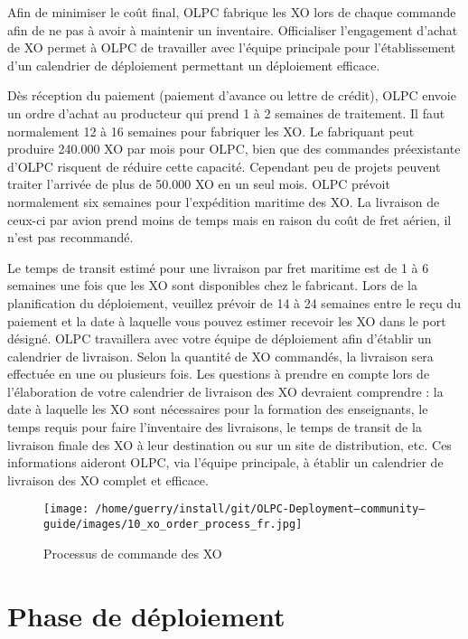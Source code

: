 \documentclass[12pt]{article}
\begin{document}

Afin de minimiser le coût final, OLPC fabrique les XO lors de chaque
commande afin de ne pas à avoir à maintenir un inventaire. Officialiser
l'engagement d'achat de XO permet à OLPC de travailler avec l'équipe
principale pour l'établissement d'un calendrier de déploiement permettant
un déploiement efficace.

Dès réception du paiement (paiement d'avance ou lettre de crédit), OLPC
envoie un ordre d'achat au producteur qui prend 1 à 2 semaines de
traitement. Il faut normalement 12 à 16 semaines pour fabriquer les XO. Le
fabriquant peut produire 240.000 XO par mois pour OLPC, bien que des
commandes préexistante d'OLPC risquent de réduire cette capacité. Cependant
peu de projets peuvent traiter l'arrivée de plus de 50.000 XO en un seul
mois. OLPC prévoit normalement six semaines pour l'expédition maritime des
XO. La livraison de ceux-ci par avion prend moins de temps mais en raison
du coût de fret aérien, il n'est pas recommandé.

Le temps de transit estimé pour une livraison par fret maritime est de 1 à
6 semaines une fois que les XO sont disponibles chez le fabricant. Lors de
la planification du déploiement, veuillez prévoir de 14 à 24 semaines entre
le reçu du paiement et la date à laquelle vous pouvez estimer recevoir les
XO dans le port désigné. OLPC travaillera avec votre équipe de déploiement
afin d'établir un calendrier de livraison. Selon la quantité de XO
commandés, la livraison sera effectuée en une ou plusieurs fois. Les
questions à prendre en compte lors de l'élaboration de votre calendrier de
livraison des XO devraient comprendre : la date à laquelle les XO sont
nécessaires pour la formation des enseignants, le temps requis pour faire
l'inventaire des livraisons, le temps de transit de la livraison finale des
XO à leur destination ou sur un site de distribution, etc. Ces informations
aideront OLPC, via l'équipe principale, à établir un calendrier de
livraison des XO complet et efficace.

\begin{figure}[htb]
\centering
\texttt{[image: /home/guerry/install/git/OLPC-Deployment--community--guide/images/10\_xo\_order\_process\_fr.jpg]}
\caption{Processus de commande des XO}
\end{figure}
\section{Phase de déploiement}
\label{sec-9}
\end{document}
